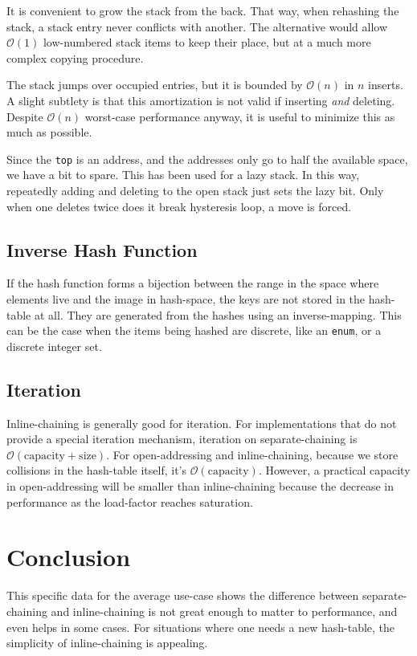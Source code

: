 \documentclass[12pt]{article}
\newcommand{\code}[1]{\colorbox{light-gray}{\texttt{#1}}}
\begin{document}
It is convenient to grow the stack from the back. That way, when rehashing the stack, a stack entry never conflicts with another. The alternative would allow $\mathcal{O}(1)$ low-numbered stack items to keep their place, but at a much more complex copying procedure.

The stack jumps over occupied entries, but it is bounded by $\mathcal{O}(n)$ in $n$ inserts. A slight subtlety is that this amortization is not valid if inserting {\it and} deleting. Despite $\mathcal{O}(n)$ worst-case performance anyway, it is useful to minimize this as much as possible.

Since the \code{top} is an address, and the addresses only go to half the available space, we have a bit to spare. This has been used for a lazy stack. In this way, repeatedly adding and deleting to the open stack just sets the lazy bit. Only when one deletes twice does it break hysteresis loop, a move is forced.

\subsection{Inverse Hash Function}

If the hash function forms a bijection between the range in the space where elements live and the image in hash-space, the keys are not stored in the hash-table at all. They are generated from the hashes using an inverse-mapping. This can be the case when the items being hashed are discrete, like an \code{enum}, or a discrete integer set.

\subsection{Iteration}

Inline-chaining is generally good for iteration. For implementations that do not provide a special iteration mechanism, iteration on separate-chaining is $\mathcal{O}(\text{capacity} + \text{size})$. For open-addressing and inline-chaining, because we store collisions in the hash-table itself, it's $\mathcal{O}(\text{capacity})$. However, a practical capacity in open-addressing will be smaller than inline-chaining because the decrease in performance as the load-factor reaches saturation.

\section{Conclusion}

This specific data for the average use-case shows the difference between separate-chaining and inline-chaining is not great enough to matter to performance, and even helps in some cases. For situations where one needs a new hash-table, the simplicity of inline-chaining is appealing.


\end{document}
